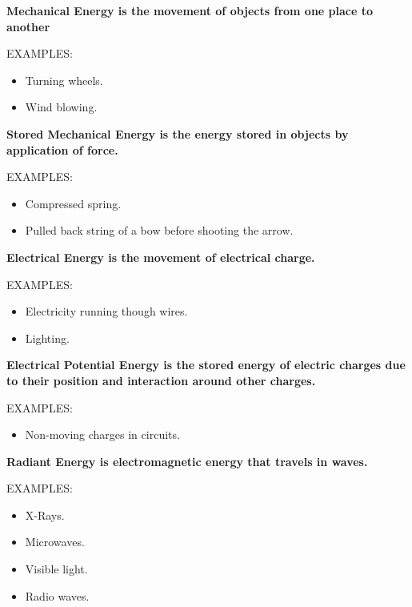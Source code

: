 \begin{definition}
	\bf{Mechanical Energy} is the movement of objects from one place to
	another

	EXAMPLES:
	\begin{itemize}
		\item Turning wheels.
		\item Wind blowing.
	\end{itemize}
\end{definition}

\begin{definition}
	\bf{Stored Mechanical Energy} is the energy stored in objects by
	application of force.

	EXAMPLES:
	\begin{itemize}
		\item Compressed spring.
		\item Pulled back string of a bow before shooting the arrow.
	\end{itemize}
\end{definition}

\begin{definition}
	\bf{Electrical Energy} is the movement of electrical charge.

	EXAMPLES:
	\begin{itemize}
		\item Electricity running though wires.
		\item Lighting.
	\end{itemize}
\end{definition}

\begin{definition}
	\bf{Electrical Potential Energy} is the stored energy of electric charges
	due to their position and interaction around other charges.

	EXAMPLES:
	\begin{itemize}
		\item Non-moving charges in circuits.
	\end{itemize}
\end{definition}

\begin{definition}
	\bf{Radiant Energy} is electromagnetic energy that travels in waves.

	EXAMPLES:
	\begin{itemize}
		\item X-Rays.
		\item Microwaves.
		\item Visible light.
		\item Radio waves.
	\end{itemize}
\end{definition}

